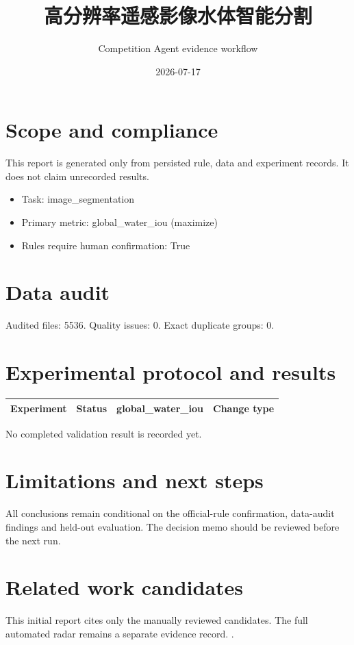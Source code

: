 \documentclass[11pt]{ctexart}
\title{高分辨率遥感影像水体智能分割}
\author{Competition Agent evidence workflow}
\date{2026-07-17}
\begin{document}
\maketitle
\section{Scope and compliance}
This report is generated only from persisted rule, data and experiment records. It does not claim unrecorded results.
\begin{itemize}
\item Task: image\_segmentation
\item Primary metric: global\_water\_iou (maximize)
\item Rules require human confirmation: True
\end{itemize}
\section{Data audit}
Audited files: 5536. Quality issues: 0. Exact duplicate groups: 0.
\section{Experimental protocol and results}
\begin{center}\begin{tabular}{llll}\toprule
Experiment & Status & global\_water\_iou & Change type \\ \midrule
\bottomrule\end{tabular}\end{center}
No completed validation result is recorded yet.
\section{Limitations and next steps}
All conclusions remain conditional on the official-rule confirmation, data-audit findings and held-out evaluation. The decision memo should be reviewed before the next run.
\section{Related work candidates}
This initial report cites only the manually reviewed candidates. The full automated radar remains a separate evidence record.
\cite{Xu2021FourierDG,Wei2024Rein,Gong2024CrossEarth,Duan2026DBFNet}.


\end{document}
